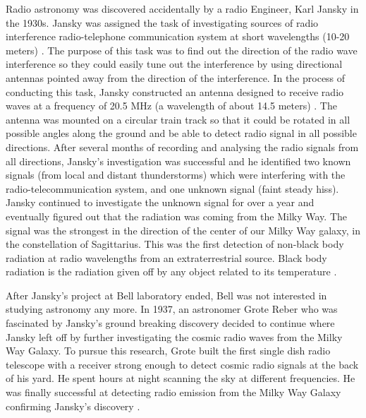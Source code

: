 Radio astronomy was discovered accidentally by a radio Engineer, Karl Jansky in the 1930s.
Jansky was assigned the task of investigating sources of radio interference radio-telephone communication system at short wavelengths (10-20 meters) \citep{verschuur2015invisible}.
The purpose of this task was to find out the direction of the radio wave interference so they could easily tune out the interference by using directional antennas pointed away from the direction of the interference. In the process of conducting this task, Jansky constructed an antenna designed to receive radio waves at a frequency of 20.5 MHz (a wavelength of about 14.5 meters) \citep{Jansky0}. The antenna was mounted on a circular train track so that it could be rotated in all possible angles along the ground and be able to detect radio signal in all possible directions. After several months of recording and analysing the radio signals from all directions, Jansky's investigation was successful and he identified two known signals (from local and  distant thunderstorms) which were interfering with the radio-telecommunication system, and one unknown signal (faint steady hiss). Jansky continued to investigate the unknown signal for over a year and eventually figured out that the radiation was coming from the Milky Way. The signal was the strongest in the direction of the center of our Milky Way
galaxy, in the constellation of Sagittarius. This was the first detection of non-black body radiation at radio wavelengths from an extraterrestrial source. Black body radiation is the radiation given off by any object
related to its temperature \citep{Jansky1}.

After Jansky's project at Bell laboratory ended, Bell was not interested in studying astronomy any more. In 1937, an astronomer Grote Reber who was fascinated by Jansky's ground breaking discovery decided to continue where Jansky left off by further investigating the cosmic radio waves from the Milky Way Galaxy. To pursue this research, Grote built the first single dish radio telescope with a receiver strong enough to detect cosmic radio signals at the back of his yard. He spent hours at night scanning the sky at different frequencies. He was finally successful at detecting radio emission from the Milky Way Galaxy confirming Jansky's discovery \citep{verschuur2015invisible}.   


